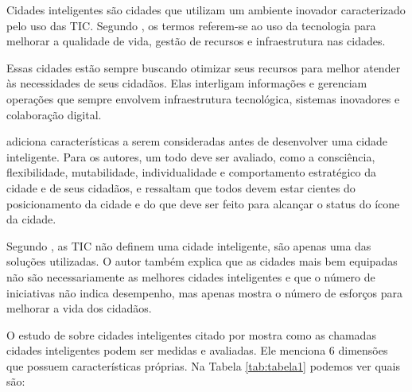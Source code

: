 Cidades inteligentes são cidades que utilizam um ambiente inovador caracterizado pelo uso das TIC. Segundo , os termos referem-se ao uso da tecnologia para melhorar a qualidade de vida, gestão de recursos e infraestrutura nas cidades.

Essas cidades estão sempre buscando otimizar seus recursos para melhor atender às necessidades de seus cidadãos. Elas interligam informações e gerenciam operações que sempre envolvem infraestrutura tecnológica, sistemas inovadores e colaboração digital.

 adiciona características a serem consideradas antes de desenvolver uma cidade inteligente. Para os autores, um todo deve ser avaliado, como a consciência, flexibilidade, mutabilidade, individualidade e comportamento estratégico da cidade e de seus cidadãos, e ressaltam que todos devem estar cientes do posicionamento da cidade e do que deve ser feito para alcançar o status do ícone da cidade.

Segundo , as TIC não definem uma cidade inteligente, são apenas uma das soluções utilizadas. O autor também explica que as cidades mais bem equipadas não são necessariamente as melhores cidades inteligentes e que o número de iniciativas não indica desempenho, mas apenas mostra o número de esforços para melhorar a vida dos cidadãos.

O estudo de  sobre cidades inteligentes citado por  mostra como as chamadas cidades inteligentes podem ser medidas e avaliadas. Ele menciona 6 dimensões que possuem características próprias. Na Tabela \ref{tab:tabela1} podemos ver quais são:


